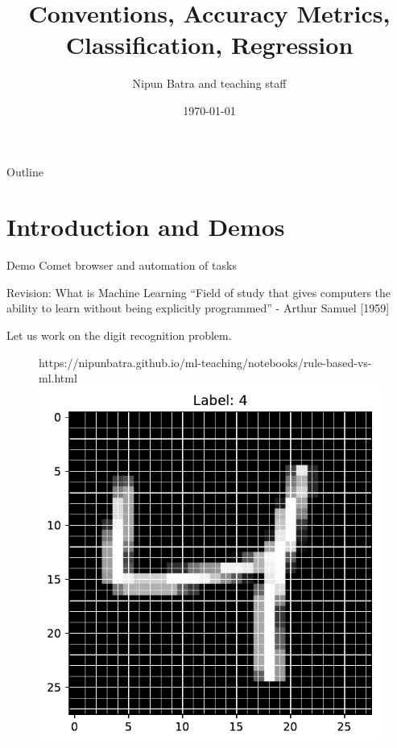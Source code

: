 \documentclass[usenames,dvipsnames]{beamer}
\title{Conventions, Accuracy Metrics, Classification, Regression}
\date{\today}
\author{Nipun Batra and teaching staff}
\institute{IIT Gandhinagar}
\begin{document}
%

  \setcounter{popquiz}{0}

  \maketitle
  
  \begin{frame}{Outline}
    \tableofcontents
  \end{frame}
  
  \section{Introduction and Demos}
  
  \begin{frame}{Demo}
	Comet browser and automation of tasks
  \end{frame}
  

 
  \begin{frame}{Revision: What is Machine Learning}
	 ``Field of study that gives computers the ability to learn
		without being explicitly programmed'' - Arthur Samuel
		[1959]

		\pause Let us work on the digit recognition problem.

		\begin{figure}[htp]
			\centering
			\begin{notebookbox}{https://nipunbatra.github.io/ml-teaching/notebooks/rule-based-vs-ml.html}
			  \includegraphics[scale=0.35]{../assets/accuracy-convention/figures/mnist.pdf}
			\end{notebookbox}
		  \end{figure}
		


	\end{frame}
		
\end{document}
